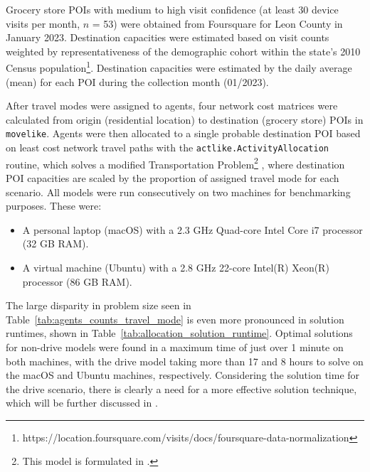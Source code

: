 

Grocery store POIs with medium to high visit confidence (at least 30 device visits per month, $n$ = 53) were obtained from Foursquare for Leon County in January 2023. Destination capacities were estimated based on visit counts weighted by representativeness of the demographic cohort within the state's 2010 Census population\footnote{https://location.foursquare.com/visits/docs/foursquare-data-normalization}. Destination capacities were estimated by the daily average (mean) for each POI during the collection month (01/2023).

After travel modes were assigned to agents, four network cost matrices were calculated from origin (residential location) to destination (grocery store) POIs in \texttt{movelike}. Agents were then allocated to a single probable destination POI based on least cost network travel paths with the \texttt{actlike.ActivityAllocation} routine, which solves a modified Transportation Problem\footnote{This model is formulated in \cite{likeness-scipy-paper-2022}.} \cite{hitchcock_distribution_1941, koopmans_optimum_1949, miller_geographic_2001, tp_miller_gc__2015}, where destination POI capacities are scaled \cite{lovelace_truncate_2013} by the proportion of assigned travel mode for each scenario. All models were run consecutively on two machines for benchmarking purposes. These were:

\begin{itemize}
    \item A personal laptop (macOS) with a 2.3 GHz Quad-core Intel Core i7 processor (32 GB RAM).
    \item A virtual machine (Ubuntu) with a 2.8 GHz 22-core Intel(R) Xeon(R) processor (86 GB RAM).
\end{itemize}
    
The large disparity in problem size seen in Table~\ref{tab:agents_counts_travel_mode} is even more pronounced in solution runtimes, shown in Table~\ref{tab:allocation_solution_runtime}. Optimal solutions for non-drive models were found in a maximum time of just over 1 minute on both machines, with the drive model taking more than 17 and 8 hours to solve on the macOS and Ubuntu machines, respectively. Considering the solution time for the drive scenario, there is clearly a need for a more effective solution technique, which will be further discussed in .



